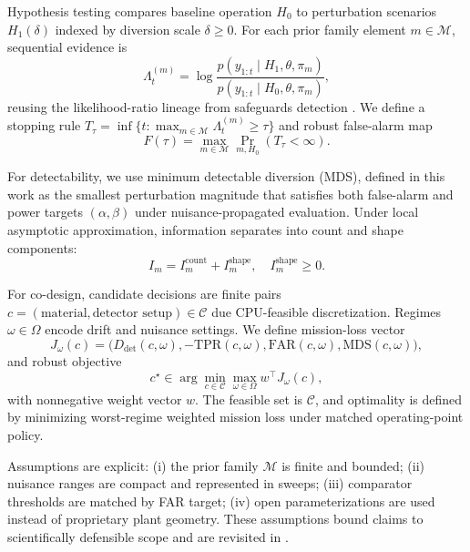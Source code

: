 \documentclass{article} %
\begin{document}
Hypothesis testing compares baseline operation $H_0$ to perturbation scenarios $H_1(\delta)$ indexed by diversion scale $\delta\ge 0$. For each prior family element $m\in\mathcal{M}$, sequential evidence is
\begin{equation}
\Lambda_t^{(m)} = \log\frac{p(y_{1:t}\mid H_1,\theta,\pi_m)}{p(y_{1:t}\mid H_0,\theta,\pi_m)},
\label{eq:sequential_lr}
\end{equation}
reusing the likelihood-ratio lineage from safeguards detection \citep{SRC009,SRC017}. We define a stopping rule $T_\tau=\inf\{t: \max_{m\in\mathcal{M}}\Lambda_t^{(m)}\ge \tau\}$ and robust false-alarm map
\begin{equation}
F(\tau)=\max_{m\in\mathcal{M}}\Pr_{m,H_0}(T_\tau<\infty).
\label{eq:far_map}
\end{equation}

For detectability, we use minimum detectable diversion (MDS), defined in this work as the smallest perturbation magnitude that satisfies both false-alarm and power targets $(\alpha,\beta)$ under nuisance-propagated evaluation. Under local asymptotic approximation, information separates into count and shape components:
\begin{equation}
I_m = I_m^{\mathrm{count}} + I_m^{\mathrm{shape}}, \quad I_m^{\mathrm{shape}}\ge 0.
\label{eq:info_decomp}
\end{equation}

For co-design, candidate decisions are finite pairs $c=(\text{material},\text{detector setup})\in\mathcal{C}$ due CPU-feasible discretization. Regimes $\omega\in\Omega$ encode drift and nuisance settings. We define mission-loss vector
\begin{equation}
J_\omega(c)=\big(D_{\mathrm{det}}(c,\omega),-\mathrm{TPR}(c,\omega),\mathrm{FAR}(c,\omega),\mathrm{MDS}(c,\omega)\big),
\label{eq:mission_vector}
\end{equation}
and robust objective
\begin{equation}
c^\star \in \arg\min_{c\in\mathcal{C}}\max_{\omega\in\Omega} w^\top J_\omega(c),
\label{eq:robust_objective}
\end{equation}
with nonnegative weight vector $w$. The feasible set is $\mathcal{C}$, and optimality is defined by minimizing worst-regime weighted mission loss under matched operating-point policy.

Assumptions are explicit: (i) the prior family $\mathcal{M}$ is finite and bounded; (ii) nuisance ranges are compact and represented in sweeps; (iii) comparator thresholds are matched by FAR target; (iv) open parameterizations are used instead of proprietary plant geometry. These assumptions bound claims to scientifically defensible scope and are revisited in .
\end{document}
